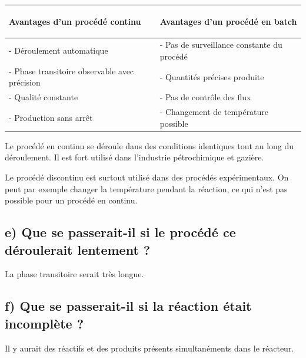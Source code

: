 \documentclass[a4paper,11pt]{article}
\begin{document}
\begin{table}[h]\centering
\begin{tabular}{|m{}|m{}|}\hline
	\rowcolor{Gray}	
	\begin{center}Avantages d'un \textbf{procédé continu}\end{center} & \begin{center}Avantages d'un procédé en \textbf{batch}\end{center} \\\hline
	- Déroulement automatique & - Pas de surveillance constante du procédé \\
	- Phase transitoire observable avec précision & - Quantités précises produite \\
	- Qualité constante & - Pas de contrôle des flux \\
	- Production sans arrêt & - Changement de température possible \\\hline
\end{tabular}
\end{table}
\noindent Le procédé en continu se déroule dans des conditions identiques tout au long du déroulement. Il est fort utilisé dans l'industrie pétrochimique et gazière.

\noindent Le procédé discontinu est surtout utilisé dans des procédés expérimentaux. On peut par exemple changer la température pendant la réaction, ce qui n'est pas possible pour un procédé en continu.

\subsection*{e) Que se passerait-il si le procédé ce déroulerait lentement ?}
La phase transitoire serait très longue.

\subsection*{f) Que se passerait-il si la réaction était incomplète ?}
Il y aurait des réactifs et des produits présents simultanéments dans le réacteur.
\end{document}
